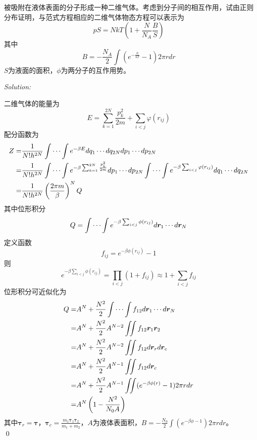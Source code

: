 \documentclass[12pt,a4paper]{article}
\newenvironment{problem}[2][Problem]{\begin{trivlist}
\item[\hskip \labelsep {\bfseries #1}\hskip \labelsep {\bfseries #2.}]}{\end{trivlist}}
\newenvironment{sol}
    {\emph{Solution:}
    }
    {
    \qed
    }
\begin{document}
\begin{problem}{9.8}
被吸附在液体表面的分子形成一种二维气体。考虑到分子间的相互作用，试由正则分布证明，与范式方程相应的二维气体物态方程可以表示为
\[
pS=NkT\left(1+\frac{N}{N_A}\frac{B}{S}\right)
\]
其中
\[
B=-\frac{N_A}{2}\int(e^{-\frac{\phi}{kT}}-1)2\pi rdr
\]
$S$为液面的面积，$\phi$为两分子的互作用势。
\end{problem}
\begin{sol}
二维气体的能量为
\begin{equation}
E=\sum_{k=1}^{2N}\frac{p_k^2}{2m}+\sum_{i<j}\varphi(r_{ij})
\end{equation}
配分函数为
\begin{align}
\nonumber Z=&\frac{1}{N!h^{2N}}\idotsint e^{-\beta E}dq_1\cdots dq_{2N}dp_1\cdots dp_{2N}\\
\nonumber=&\frac{1}{N!h^{2N}}\idotsint e^{-\beta\sum_{k=1}^{2N}\frac{p_k^2}{2m}}dp_1\cdots dp_{2N}\idotsint e^{-\beta\sum_{i<j}\varphi(r_{ij})}dq_1\cdots dq_{2N}\\
\nonumber=&\frac{1}{N!h^{2N}}\left(\frac{2\pi m}{\beta}\right)^{N}Q
\end{align}
其中位形积分
\begin{equation}
Q=\idotsint e^{-\beta\sum_{i<j}\phi(r_{ij})}d\bm{r}_1\cdots d\bm{r}_N
\end{equation}
定义函数
\begin{equation}
f_{ij}=e^{-\beta\phi(r_{ij})}-1
\end{equation}
则
\begin{equation}
e^{-\beta\sum_{i<j}\phi(r_{ij})}=\prod_{i<j}(1+f_{ij})\approx1+\sum_{i<j}f_{ij}
\end{equation}
位形积分可近似化为
\begin{align}
\nonumber Q=&A^N+\frac{N^2}{2}\idotsint f_{12}d\bm{r}_1\cdots d\bm{r}_N\\
\nonumber=&A^N+\frac{N^2}{2}A^{N-2}\iint f_{12}\bm{r}_1\bm{r}_2\\
\nonumber=&A^N+\frac{N^2}{2}A^{N-2}\iint f_{12}d\bm{r}_rd\bm{r}_c\\
\nonumber=&A^N+\frac{N^2}{2}A^{N-1}\iint f_{12}d\bm{r}_c\\
\nonumber=&A^N+\frac{N^2}{2}A^{N-1}\iint(e^{-\beta\phi(r)}-1)2\pi rdr\\
=&A^N\left(1-\frac{N^2}{N_0A}\right)
\end{align}
其中$\bm{\tau}_r=\bm{\tau}$，$\bm{\tau}_c=\frac{m_1\bm{\tau}_1\bm{\tau}_2}{m_1+m_2}$，$A$为液体表面积，$B=-\frac{N_0}{2}\int(e^{-\beta\phi-1})2\pi rdr$。\\

\end{sol}
\end{document}
